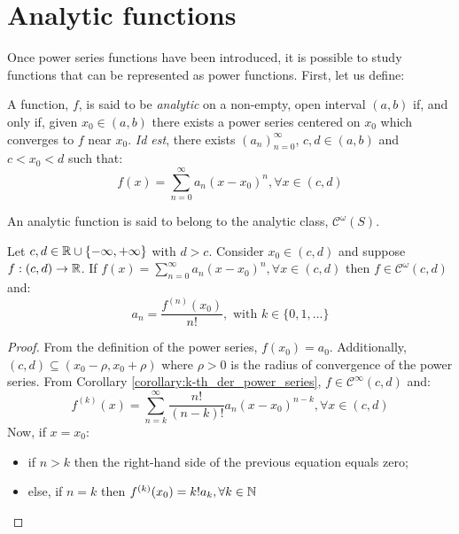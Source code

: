 \section{Analytic functions}

Once power series functions have been introduced, it is possible to study functions that can be represented as power functions. First, let us define:

\begin{definition}
    A function, $f$, is said to be \emph{analytic} on a non-empty, open interval $(a,b)$ if, and only if, given $x_0 \in (a,b)$ there exists a power series centered on $x_0$ which converges to $f$ near $x_0$. \emph{Id est}, there exists $(a_n)_{n=0}^\infty$, $c, d \in (a,b)$ and $c < x_0 < d$ such that:
    \begin{equation*}
        f(x) = \sum \limits_{n=0}^\infty a_n (x - x_0)^n, \forall x \in (c,d)
    \end{equation*}
\end{definition}

\begin{remark}
    An analytic function is said to belong to the analytic class, $\mathcal{C}^\omega(S)$.
\end{remark}

\begin{theorem}[Uniqueness]
    Let $c, d \in \mathbb{R} \cup \{-\infty, +\infty\}$ with $d > c$. Consider $x_0 \in (c, d)$ and suppose $f: (c,d) \to \mathbb{R}$. If $f(x) = \sum_{n=0}^\infty a_n (x - x_0)^n, \forall x \in (c, d)$ then $f \in \mathcal{C}^\omega(c,d)$ and:
    \begin{equation*}
        a_n = \frac{f^{(n)}(x_0)}{n!}, \text{ with } k \in \{0, 1, ...\}
    \end{equation*}
\end{theorem}

\begin{proof}
    From the definition of the power series, $f(x_0) = a_0$. Additionally, $(c,d) \subseteq (x_0 - \rho, x_0 + \rho)$ where $\rho > 0$ is the radius of convergence of the power series. From Corollary \ref{corollary:k-th_der_power_series}, $f \in \mathcal{C}^\infty(c,d)$ and:
    \begin{equation*}
        f^{(k)}(x) = \sum \limits_{n=k}^\infty \frac{n!}{(n-k)!}a_n (x - x_0)^{n-k}, \forall x \in (c,d)
    \end{equation*}
    Now, if $x = x_0$:
    \begin{itemize}
        \item if $n > k$ then the right-hand side of the previous equation equals zero;
        \item else, if $n = k$ then $f^{(k)}(x_0) = k! a_k, \forall k \in \mathbb{N}$
    \end{itemize}
\end{proof}

